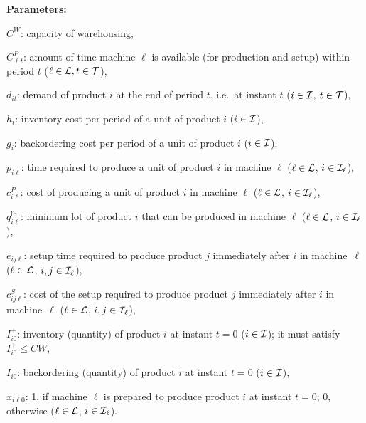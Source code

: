 \documentclass[11pt]{article}
\begin{document}
\noindent
\textbf{Parameters:}
\begin{description}[topsep=2pt,itemsep=1pt]
\item[]$C^W$: capacity of warehousing,
\item[]$C^P_{\ell t}$: amount of time machine $\ell$ is available (for production and setup) within period $t$ ($\ell \in {\cal L}, t \in {\cal T}$),
\item[]$d_{it}$: demand of product $i$ at the end of period $t$, i.e.\ at instant $t$ ($i \in {\cal I}$, $t \in {\cal T}$),
\item[]$h_i$: inventory cost per period of a unit of product $i$ ($i \in {\cal I}$),
\item[]$g_i$: backordering cost per period of a unit of product $i$ ($i \in {\cal I}$),
\item[]$p_{i\ell }$: time required to produce a unit of product $i$ in machine $\ell$ ($\ell \in {\cal L}$, $i \in {\cal I_{\ell}}$),
\item[]$c^P_{i\ell }$: cost of producing a unit of product $i$ in machine $\ell$ ($\ell \in {\cal L}$, $i \in {\cal I_{\ell}}$),
\item[]$q^{\mathrm{lb}}_{i\ell }$: minimum lot of product $i$ that can be produced in machine $\ell$ ($\ell \in {\cal L}$, $i \in {\cal I_{\ell}}$),
\item[]$e_{ij\ell }$: setup time required to produce product $j$ immediately after $i$ in machine~$\ell$ ($\ell \in {\cal L}$, $i, j \in {\cal I_{\ell}}$),
\item[]$c^S_{ij\ell}$: cost of the setup required to produce product $j$ immediately after $i$ in machine~$\ell$ ($\ell \in {\cal L}$, $i, j \in {\cal I_{\ell}}$),
\item[]$I_{i0}^+$: inventory (quantity) of product $i$ at instant $t=0$ ($i \in {\cal I}$); it must satisfy $I_{i0}^+ \leq CW$,
\item[]$I_{i0}^-$: backordering (quantity) of product $i$ at instant $t=0$ ($i \in {\cal I}$),
\item[]$x_{i\ell 0}$: 1, if machine $\ell $ is prepared to produce product $i$ at instant $t=0$; 0, otherwise ($\ell \in {\cal L}$, $i \in {\cal I_{\ell}}$).
\end{description}
\end{document}

